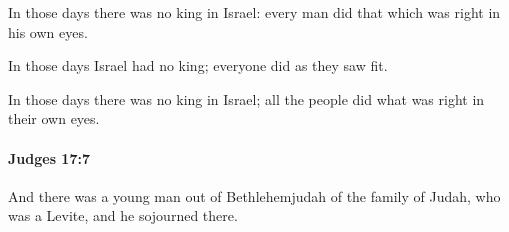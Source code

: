 			\begin{versebox}
					\item[BHS] 
					\item[ASV] In those days there was no king in Israel: every man did that which was right in his own eyes.
					\item[NIV] In those days Israel had no king; everyone did as they saw fit.
					\item[NRSV] In those days there was no king in Israel; all the people did what was right in their own eyes.
			\end{versebox}

		\paragraph{Judges 17:7} %
			\label{JUDGES-17-7}

			And there was a young man out of Bethlehemjudah of the family of Judah, who was a Levite, and he sojourned there.

